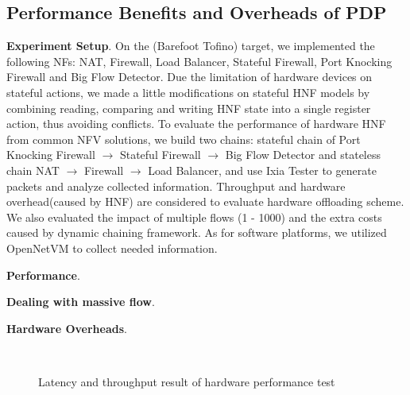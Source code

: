 \documentclass[10pt, conference, letterpaper]{IEEEtran}
\begin{document}
\subsection{Performance Benefits and Overheads of PDP}
\textbf{Experiment Setup}. On the (Barefoot Tofino) target, we implemented the following NFs: NAT, Firewall, Load Balancer, Stateful Firewall, Port Knocking Firewall and Big Flow Detector. Due the limitation of hardware devices on stateful actions, we made a little modifications on stateful HNF models by combining reading, comparing and writing HNF state into a single register action, thus avoiding conflicts. 
To evaluate the performance of hardware HNF from common NFV solutions, we build two chains: stateful chain of Port Knocking Firewall 	$\rightarrow$ Stateful Firewall 	$\rightarrow$  Big Flow Detector and stateless chain NAT 	$\rightarrow$ Firewall 	$\rightarrow$ Load Balancer, and use Ixia Tester to generate packets and analyze collected information. Throughput and hardware overhead(caused by HNF) are considered to evaluate hardware offloading scheme. We also evaluated the impact of multiple flows (1 - 1000) and the extra costs caused by dynamic chaining framework. As for software platforms, we utilized OpenNetVM to collect needed information.

\textbf{Performance}.

\textbf{Dealing with massive flow}.

\textbf{Hardware Overheads}.


\begin{figure}  
\centering  
{}  
\label{2a}
\label{2b}\\
\caption{Latency and throughput result of hardware performance test}  
\label{hard}  
\end{figure} 
\end{document}
